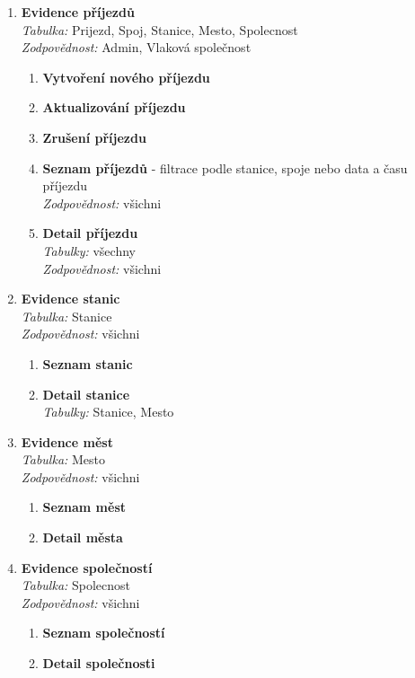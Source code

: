 \documentclass[11pt]{article}
\begin{document}
\begin{enumerate}
    \item \textbf{Evidence příjezdů}\\
        \textit{Tabulka:} Prijezd, Spoj, Stanice, Mesto, Spolecnost\\
        \textit{Zodpovědnost:} Admin, Vlaková společnost
        \begin{enumerate}
            \item \textbf{Vytvoření nového příjezdu}
            \item \textbf{Aktualizování příjezdu}
            \item \textbf{Zrušení příjezdu}
            \item \textbf{Seznam příjezdů} - filtrace podle stanice, spoje nebo data a času příjezdu\\
            \textit{Zodpovědnost:} všichni
            \item \textbf{Detail příjezdu}\\
            \textit{Tabulky:} všechny\\
            \textit{Zodpovědnost:} všichni
        \end{enumerate}

    \item \textbf{Evidence stanic}\\
        \textit{Tabulka:} Stanice\\
        \textit{Zodpovědnost:} všichni
        \begin{enumerate}
            \item \textbf{Seznam stanic}
            \item \textbf{Detail stanice}\\
            \textit{Tabulky:} Stanice, Mesto
        \end{enumerate}

    \item \textbf{Evidence měst}\\
        \textit{Tabulka:} Mesto\\
        \textit{Zodpovědnost:} všichni
        \begin{enumerate}
            \item \textbf{Seznam měst}
            \item \textbf{Detail města}
        \end{enumerate}

    \item \textbf{Evidence společností}\\
        \textit{Tabulka:} Spolecnost\\
        \textit{Zodpovědnost:} všichni
        \begin{enumerate}
            \item \textbf{Seznam společností}
            \item \textbf{Detail společnosti}
        \end{enumerate}
\end{enumerate}
\end{document}
